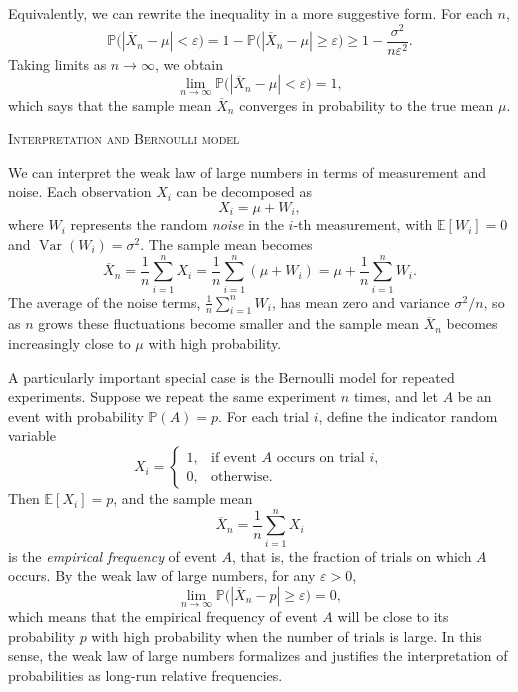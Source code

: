 Equivalently, we can rewrite the inequality in a more suggestive form.  
For each \(n\),
\[
\mathbb{P}\big(|\overline{X}_{n} - \mu| < \varepsilon\big)
=
1 - \mathbb{P}\big(|\overline{X}_{n} - \mu| \ge \varepsilon\big)
\ge
1 - \frac{\sigma^{2}}{n \varepsilon^{2}}.
\]
Taking limits as \(n \to \infty\), we obtain
\[
\lim_{n \to \infty} \mathbb{P}\big(|\overline{X}_{n} - \mu| < \varepsilon\big)
=
1,
\]
which says that the sample mean \(\overline{X}_{n}\) converges in probability to the true mean \(\mu\).  

\bigskip
\textsc{Interpretation and Bernoulli model}

We can interpret the weak law of large numbers in terms of measurement and noise.  
Each observation \(X_i\) can be decomposed as
\[
X_i = \mu + W_i,
\]
where \(W_i\) represents the random \textit{noise} in the \(i\)-th measurement, with \(\mathbb{E}[W_i] = 0\) and \(\operatorname{Var}(W_i) = \sigma^{2}\).  
The sample mean becomes
\[
\overline{X}_{n}
=
\frac{1}{n} \sum_{i=1}^{n} X_i
=
\frac{1}{n} \sum_{i=1}^{n} (\mu + W_i)
=
\mu + \frac{1}{n} \sum_{i=1}^{n} W_i.
\]
The average of the noise terms, \(\frac{1}{n}\sum_{i=1}^{n} W_i\), has mean zero and variance \(\sigma^{2}/n\), so as \(n\) grows these fluctuations become smaller and the sample mean \(\overline{X}_{n}\) becomes increasingly close to \(\mu\) with high probability.  

A particularly important special case is the Bernoulli model for repeated experiments.  
Suppose we repeat the same experiment \(n\) times, and let \(A\) be an event with probability \(\mathbb{P}(A) = p\).  
For each trial \(i\), define the indicator random variable
\[
X_i
=
\begin{cases}
1, & \text{if event } A \text{ occurs on trial } i,\\
0, & \text{otherwise.}
\end{cases}
\]
Then \(\mathbb{E}[X_i] = p\), and the sample mean
\[
\overline{X}_{n}
=
\frac{1}{n}\sum_{i=1}^{n} X_i
\]
is the \textit{empirical frequency} of event \(A\), that is, the fraction of trials on which \(A\) occurs.  
By the weak law of large numbers, for any \(\varepsilon > 0\),
\[
\lim_{n \to \infty} \mathbb{P}\big(|\overline{X}_{n} - p| \ge \varepsilon\big) = 0,
\]
which means that the empirical frequency of event \(A\) will be close to its probability \(p\) with high probability when the number of trials is large.  
In this sense, the weak law of large numbers formalizes and justifies the interpretation of probabilities as long-run relative frequencies.


